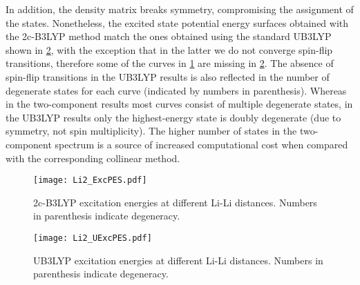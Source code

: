 \documentclass[12pt]{article}
\begin{document}
In addition, the density matrix breaks symmetry, compromising the assignment of the states.
Nonetheless, the excited state potential energy surfaces obtained with the 2c-B3LYP method match the ones obtained using the standard UB3LYP shown in  \cref{fg:Li2UPES}, with the exception that in the latter we do not converge spin-flip transitions, therefore some of the curves in \cref{fg:Li2PES} are missing in \cref{fg:Li2UPES}.
The absence of spin-flip transitions in the UB3LYP results is also reflected in the number of degenerate states for each curve (indicated by numbers in parenthesis).
Whereas in the two-component results most curves consist of multiple degenerate states, in the UB3LYP results only the highest-energy state is doubly degenerate (due to symmetry, not spin multiplicity).
The higher number of states in the two-component spectrum is a source of increased computational cost when compared with the corresponding collinear method.

\begin{figure}
 \caption{2c-B3LYP excitation energies at different Li-Li distances. Numbers in parenthesis indicate degeneracy.}
 \centering\texttt{[image: Li2\_ExcPES.pdf]}
 \label{fg:Li2PES}
\end{figure}

\begin{figure}
 \caption{UB3LYP excitation energies at different Li-Li distances. Numbers in parenthesis indicate degeneracy.}
 \centering\texttt{[image: Li2\_UExcPES.pdf]}
 \label{fg:Li2UPES}
\end{figure}
\end{document}
